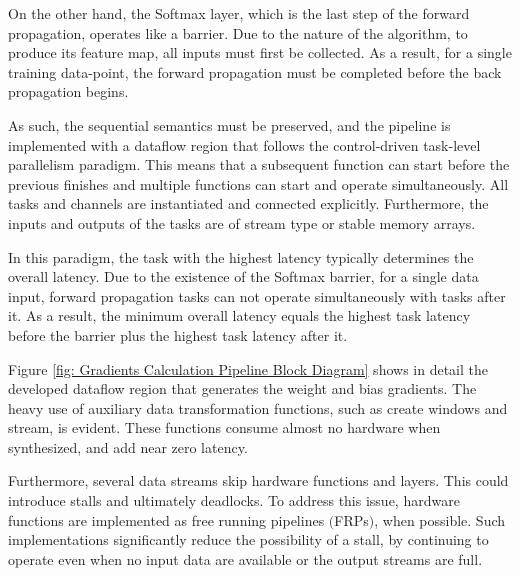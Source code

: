 On the other hand, the Softmax layer, which is the last step of the forward propagation, operates like a barrier. Due to the nature of the algorithm, to produce its feature map, all inputs must first be collected. As a result, for a single training data-point, the forward propagation must be completed before the back propagation begins. %

As such, the sequential semantics must be preserved, and the pipeline is implemented with a dataflow region that follows the control-driven task-level parallelism paradigm. This means that a subsequent function can start before the previous finishes and multiple functions can start and operate simultaneously. All tasks and channels are instantiated and connected explicitly. Furthermore, the inputs and outputs of the tasks are of stream type or stable memory arrays. %

In this paradigm, the task with the highest latency typically determines the overall latency. Due to the existence of the Softmax barrier, for a single data input, forward propagation tasks can not operate simultaneously with tasks after it. As a result, the minimum overall latency equals the highest task latency before the barrier plus the highest task latency after it. %

Figure \ref{fig: Gradients Calculation Pipeline Block Diagram} shows in detail the developed dataflow region that generates the weight and bias gradients. The heavy use of auxiliary data transformation functions, such as create windows and stream, is evident. These functions consume almost no hardware when synthesized, and add near zero latency. %

Furthermore, several data streams skip hardware functions and layers. This could introduce stalls and ultimately deadlocks. To address this issue, hardware functions are implemented as free running pipelines $($FRPs$)$, when possible. Such implementations significantly reduce the possibility of a stall, by continuing to operate even when no input data are available or the output streams are full. %

